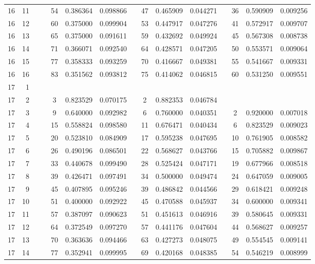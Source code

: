 \begin{appendix}
\begin{longtable}[h]{rrrcccccccccccc}
16	&	11	&&&	54	&	0.386364	&	0.098866	&&	47	&	0.465909	&	0.044271	&&	36	&	0.590909	&	0.009256	\\
16	&	12	&&&	60	&	0.375000	&	0.099904	&&	53	&	0.447917	&	0.047276	&&	41	&	0.572917	&	0.009707	\\
16	&	13	&&&	65	&	0.375000	&	0.091611	&&	59	&	0.432692	&	0.049924	&&	45	&	0.567308	&	0.008738	\\
16	&	14	&&&	71	&	0.366071	&	0.092540	&&	64	&	0.428571	&	0.047205	&&	50	&	0.553571	&	0.009064	\\
16	&	15	&&&	77	&	0.358333	&	0.093259	&&	70	&	0.416667	&	0.049381	&&	55	&	0.541667	&	0.009331	\\
16	&	16	&&&	83	&	0.351562	&	0.093812	&&	75	&	0.414062	&	0.046815	&&	60	&	0.531250	&	0.009551	\\
17	&	1	&&&		&		&		&&		&		&		&&		&		&		\\
17	&	2	&&&	3	&	0.823529	&	0.070175	&&	2	&	0.882353	&	0.046784	&&		&		&		\\
17	&	3	&&&	9	&	0.640000	&	0.092982	&&	6	&	0.760000	&	0.040351	&&	2	&	0.920000	&	0.007018	\\
17	&	4	&&&	15	&	0.558824	&	0.098580	&&	11	&	0.676471	&	0.040434	&&	6	&	0.823529	&	0.009023	\\
17	&	5	&&&	20	&	0.523810	&	0.084909	&&	17	&	0.595238	&	0.047695	&&	10	&	0.761905	&	0.008582	\\
17	&	6	&&&	26	&	0.490196	&	0.086501	&&	22	&	0.568627	&	0.043766	&&	15	&	0.705882	&	0.009867	\\
17	&	7	&&&	33	&	0.440678	&	0.099490	&&	28	&	0.525424	&	0.047171	&&	19	&	0.677966	&	0.008518	\\
17	&	8	&&&	39	&	0.426471	&	0.097491	&&	34	&	0.500000	&	0.049474	&&	24	&	0.647059	&	0.009005	\\
17	&	9	&&&	45	&	0.407895	&	0.095246	&&	39	&	0.486842	&	0.044566	&&	29	&	0.618421	&	0.009248	\\
17	&	10	&&&	51	&	0.400000	&	0.092922	&&	45	&	0.470588	&	0.045937	&&	34	&	0.600000	&	0.009341	\\
17	&	11	&&&	57	&	0.387097	&	0.090623	&&	51	&	0.451613	&	0.046916	&&	39	&	0.580645	&	0.009331	\\
17	&	12	&&&	64	&	0.372549	&	0.097270	&&	57	&	0.441176	&	0.047604	&&	44	&	0.568627	&	0.009257	\\
17	&	13	&&&	70	&	0.363636	&	0.094466	&&	63	&	0.427273	&	0.048075	&&	49	&	0.554545	&	0.009141	\\
17	&	14	&&&	77	&	0.352941	&	0.099995	&&	69	&	0.420168	&	0.048385	&&	54	&	0.546219	&	0.008999	\\

\end{longtable}
\end{appendix}
